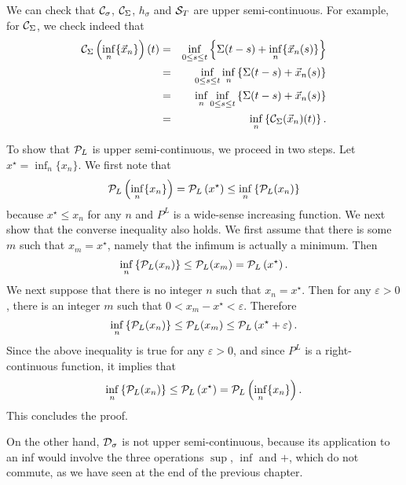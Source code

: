 We can check that $\mathcal C_{\sigma}$, $\mathcal C_{\Sigma}$, $h_\sigma$ and $\mathcal S_T$ are upper semi-continuous.
For example, for $\mathcal C_{\Sigma}$, we check indeed that
\begin{eqnarray*}
 \mathcal C_{\Sigma} \left( \inf_n \{ \vec{x}_n \} \right)(t)
& = & \inf_{0 \leq s \leq t} \left\{ \Sigma(t-s) +  \inf_n \{ \vec{x}_n(s) \} \right\} \\
& = & \inf_{0 \leq s \leq t} \inf_n \left\{ \Sigma(t-s) + \vec{x}_n(s) \right\} \\
& = & \inf_n \inf_{0 \leq s \leq t} \left\{ \Sigma(t-s) + \vec{x}_n(s) \right\} \\
& = & \inf_n \left\{ \mathcal C_{\Sigma} (\vec{x}_n)(t) \right\}.
\end{eqnarray*}

To show that  $\mathcal P_L$ is upper semi-continuous, we proceed in two steps.
Let $x^\star = \inf_n  \{ x_n \}$. We first note that
$$ \mathcal P_L \left( \inf_n \{ x_n \} \right) =
\mathcal P_L \left( x^\star \right) \leq \inf_n  \left\{ \mathcal P_L ( x_n ) \right\} $$
because  $x^\star \leq x_n$ for any $n$ and $P^L$ is a wide-sense increasing
function.
We next show that the converse inequality also holds.
We first assume that there is some $m$ such that $x_m = x^\star$, namely that the infimum is actually a minimum. Then
$$  \inf_n  \left\{ \mathcal P_L ( x_n ) \right\} \leq  \mathcal P_L ( x_m )
= \mathcal P_L \left( x^\star \right). $$
We next suppose that there is no integer $n$ such that $x_n =  x^\star$. Then for any $\varepsilon > 0$, there is an integer $m$
such that $0 < x_m - x^\star < \varepsilon$. Therefore
$$  \inf_n  \left\{ \mathcal P_L ( x_n ) \right\} \leq  \mathcal P_L ( x_m ) \leq \mathcal P_L \left( x^\star + \varepsilon \right). $$
Since the above inequality is true for any $\varepsilon > 0$, and since $P^L$ is a right-continuous function, it implies that
$$  \inf_n  \left\{ \mathcal P_L ( x_n ) \right\} \leq \mathcal P_L \left( x^\star \right) =   \mathcal P_L \left( \inf_n \{ x_n \} \right). $$
This concludes the proof.

On the other hand, $\mathcal D_{\sigma}$ is not upper semi-continuous,
because its application to an inf would involve the three
operations $\sup$, $\inf$ and $+$, which do not commute, as we
have seen at the end of the previous chapter.

%

